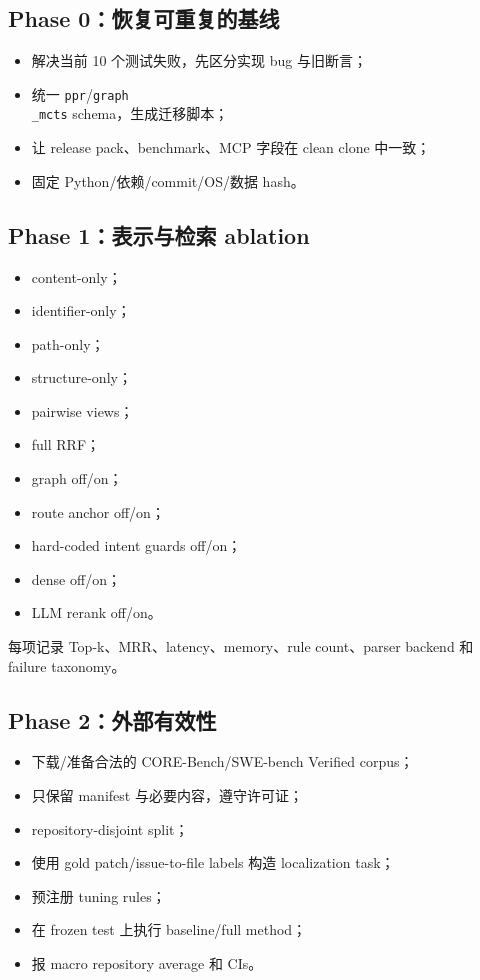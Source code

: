 \documentclass[UTF8,12pt,openany]{ctexbook}
\begin{document}
\subsection{Phase 0：恢复可重复的基线}

\begin{itemize}
\item 解决当前 10 个测试失败，先区分实现 bug 与旧断言；
\item 统一 \texttt{ppr}/\texttt{graph\\_mcts} schema，生成迁移脚本；
\item 让 release pack、benchmark、MCP 字段在 clean clone 中一致；
\item 固定 Python/依赖/commit/OS/数据 hash。
\end{itemize}

\subsection{Phase 1：表示与检索 ablation}

\begin{itemize}
\item content-only；
\item identifier-only；
\item path-only；
\item structure-only；
\item pairwise views；
\item full RRF；
\item graph off/on；
\item route anchor off/on；
\item hard-coded intent guards off/on；
\item dense off/on；
\item LLM rerank off/on。
\end{itemize}

每项记录 Top-k、MRR、latency、memory、rule count、parser backend 和 failure taxonomy。\par

\subsection{Phase 2：外部有效性}

\begin{itemize}
\item 下载/准备合法的 CORE-Bench/SWE-bench Verified corpus；
\item 只保留 manifest 与必要内容，遵守许可证；
\item repository-disjoint split；
\item 使用 gold patch/issue-to-file labels 构造 localization task；
\item 预注册 tuning rules；
\item 在 frozen test 上执行 baseline/full method；
\item 报 macro repository average 和 CIs。
\end{itemize}
\end{document}
